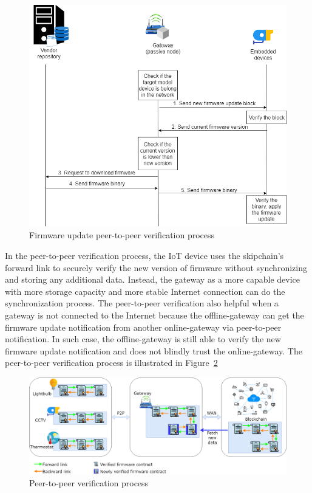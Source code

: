 \begin{figure}[H]
	\begin{center}
		\includegraphics[width=1.0\textwidth]{figures/firmware_update-firmware_update_execution.png}
		\caption{Firmware update peer-to-peer verification process} 
		\label{fig:executionprocess}
	\end{center}
\end{figure}

In the peer-to-peer verification process, the IoT device uses the skipchain's forward link to securely verify the new version of firmware without synchronizing and storing any additional data. Instead, the gateway as a more capable device with more storage capacity and more stable Internet connection can do the synchronization process. The peer-to-peer verification also helpful when a gateway is not connected to the Internet because the offline-gateway can get the firmware update notification from another online-gateway via peer-to-peer notification. In such case, the offline-gateway is still able to verify the new firmware update notification and does not blindly trust the online-gateway. The peer-to-peer verification process is illustrated in Figure~\ref{fig:p2pverification}

\begin{figure}[H]
	\begin{center}
		\includegraphics[width=1.0\textwidth]{figures/firmware_update-skipchain_p2p_update.png}
		\caption{Peer-to-peer verification process} 
		\label{fig:p2pverification}
	\end{center}
\end{figure}


